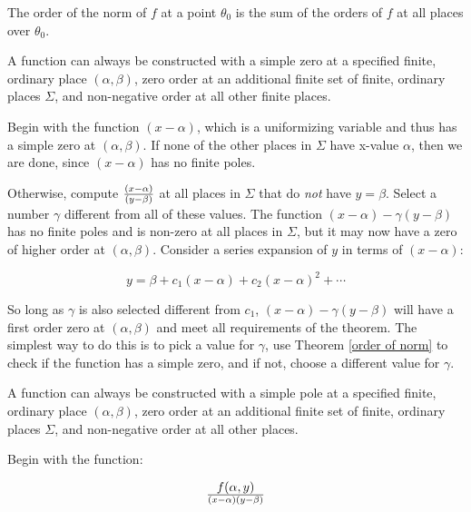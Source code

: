 \endtheorem

\theorem
\label{order of norm}
The order of the norm of $f$ at a point $\theta_0$ is the sum of the orders
of $f$ at all places over $\theta_0$.

\endtheorem


\theorem
\label{simple zero construction}

A function can always be constructed with a simple zero at a specified
finite, ordinary place $(\alpha, \beta)$, zero order at an additional
finite set of finite, ordinary places $\Sigma$, and non-negative order
at all other finite places.

\proof

Begin with the function $(x-\alpha)$, which is a uniformizing variable
and thus has a simple zero at $(\alpha, \beta)$.  If none of the other
places in $\Sigma$ have x-value $\alpha$, then we are done, since
$(x-\alpha)$ has no finite poles.

Otherwise, compute $(x-\alpha)\over(y-\beta)$ at all places in
$\Sigma$ that do {\it not} have $y = \beta$.  Select a number
$\gamma$ different from all of these values.  The function $(x-\alpha)
- \gamma (y-\beta)$ has no finite poles and
is non-zero at all places in $\Sigma$, but it may now have a zero of
higher order at $(\alpha, \beta)$.  Consider a series expansion
of $y$ in terms of $(x-\alpha)$:

$$y = \beta + c_1 (x-\alpha) + c_2 (x-\alpha)^2 + \cdots$$

So long as $\gamma$ is also selected different from $c_1$, $(x-\alpha)
- \gamma (y-\beta)$ will have a first order zero at $(\alpha, \beta)$
and meet all requirements of the theorem.  The simplest way to do this
is to pick a value for $\gamma$, use Theorem \ref{order of norm} to
check if the function has a simple zero, and if not, choose a
different value for $\gamma$.


\endtheorem

\theorem
\label{simple pole construction}

A function can always be constructed with a simple pole at a specified
finite, ordinary place $(\alpha, \beta)$, zero order at an additional
finite set of finite, ordinary places $\Sigma$, and non-negative order
at all other places.

\proof

Begin with the function:

$$f(\alpha,y)\over(x-\alpha)(y-\beta)$$

